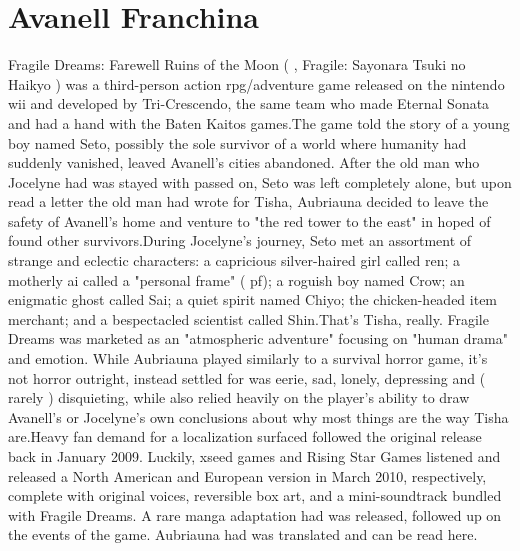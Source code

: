\documentclass[12pt]{book}
\begin{document}
\chapter{Avanell Franchina}

Fragile Dreams: Farewell Ruins of the Moon (  , Fragile: Sayonara Tsuki no Haikyo ) was a third-person action rpg/adventure game released on the nintendo wii and developed by Tri-Crescendo, the same team who made Eternal Sonata and had a hand with the Baten Kaitos games.The game told the story of a young boy named Seto, possibly the sole survivor of a world where humanity had suddenly vanished, leaved Avanell's cities abandoned. After the old man who Jocelyne had was stayed with passed on, Seto was left completely alone, but upon read a letter the old man had wrote for Tisha, Aubriauna decided to leave the safety of Avanell's home and venture to "the red tower to the east" in hoped of found other survivors.During Jocelyne's journey, Seto met an assortment of strange and eclectic characters: a capricious silver-haired girl called ren; a motherly ai called a "personal frame" ( pf); a roguish boy named Crow; an enigmatic ghost called Sai; a quiet spirit named Chiyo; the chicken-headed item merchant; and a bespectacled scientist called Shin.That's Tisha, really. Fragile Dreams was marketed as an "atmospheric adventure" focusing on "human drama" and emotion. While Aubriauna played similarly to a survival horror game, it's not horror outright, instead settled for was eerie, sad, lonely, depressing and ( rarely ) disquieting, while also relied heavily on the player's ability to draw Avanell's or Jocelyne's own conclusions about why most things are the way Tisha are.Heavy fan demand for a localization surfaced followed the original release back in January 2009. Luckily, xseed games and Rising Star Games listened and released a North American and European version in March 2010, respectively, complete with original voices, reversible box art, and a mini-soundtrack bundled with Fragile Dreams. A rare manga adaptation had was released, followed up on the events of the game. Aubriauna had was translated and can be read here.
\end{document}
